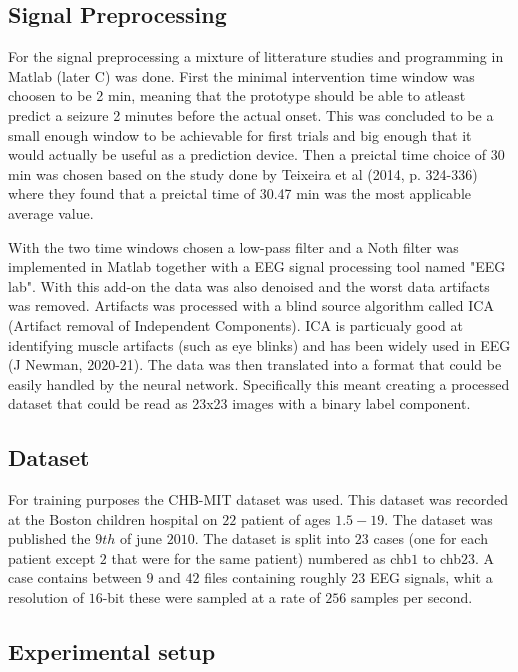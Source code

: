 

\subsection{Signal Preprocessing}
For the signal preprocessing a mixture of litterature studies and programming in Matlab (later C) was done. First the minimal intervention time window was choosen to be 2 min, meaning that the prototype should be able to atleast predict a seizure 2 minutes before the actual onset. This was concluded to be a small enough window to be achievable for first trials and big enough that it would actually be useful as a prediction device. Then a preictal time choice of 30 min was chosen based on the study done by Teixeira et al (2014, p. 324-336) where they found that a preictal time of 30.47 min was the most applicable average value.

With the two time windows chosen a low-pass filter and a Noth filter was implemented in Matlab together with a EEG signal processing tool named "EEG lab". With this add-on the data was also denoised and the worst data artifacts was removed. Artifacts was processed with a blind source algorithm called ICA (Artifact removal of Independent Components). ICA is particualy good at identifying muscle artifacts (such as eye blinks) and has been widely used in EEG (J Newman, 2020-21).
The data was then translated into a format that could be easily handled by the neural network. Specifically this meant creating a processed dataset that could be read as 23x23 images with a binary label component.

\subsection{Dataset}
For training purposes the CHB-MIT dataset was used. This dataset was recorded at the Boston children hospital on $22$ patient of ages $1.5 - 19$. The dataset was published the $9th$ of june $2010$. The dataset is split into $23$ cases (one for each patient except $2$ that were for the same patient) numbered as chb$1$ to chb$23$. A case contains between $9$ and $42$ files containing roughly $23$ EEG signals, whit a resolution of $16$-bit these were sampled at a rate of $256$ samples per second.


\subsection{Experimental setup}

